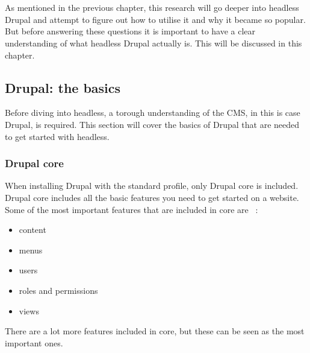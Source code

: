 \chapter{}
\label{ch:stand-van-zaken}



As mentioned in the previous chapter, this research will go deeper into headless Drupal and attempt to figure out how to utilise it and why it became so popular. But before answering these questions it is important to have a clear understanding of what headless Drupal actually is. This will be discussed in this chapter. 

\section{Drupal: the basics}

Before diving into headless, a torough understanding of the CMS, in this is case Drupal, is required. This section will cover the basics of Drupal that are needed to get started with headless.


\subsection{Drupal core}

When installing Drupal with the standard profile, only \gls{Drupal core} is included. Drupal core includes all the basic features you need to get started on a website. Some of the most important features that are included in core are ~\autocite{Tomlinson2015}: 

\begin{itemize}
	\item  content
	\item  menus
	\item  users
	\item  roles and permissions
	\item  views
\end{itemize}
There are a lot more features included in core, but these can be seen as the most important ones.

